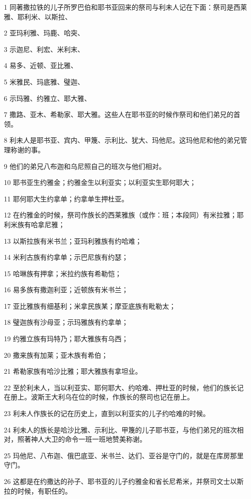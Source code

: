 \par 1 同著撒拉铁的儿子所罗巴伯和耶书亚回来的祭司与利未人记在下面：祭司是西莱雅、耶利米、以斯拉、
\par 2 亚玛利雅、玛鹿、哈突、
\par 3 示迦尼、利宏、米利末、
\par 4 易多、近顿、亚比雅、
\par 5 米雅民、玛底雅、璧迦、
\par 6 示玛雅、约雅立、耶大雅、
\par 7 撒路、亚木、希勒家、耶大雅。这些人在耶书亚的时候作祭司和他们弟兄的首领。
\par 8 利未人是耶书亚、宾内、甲篾、示利比、犹大、玛他尼。这玛他尼和他的弟兄管理称谢的事。
\par 9 他们的弟兄八布迦和乌尼照自己的班次与他们相对。
\par 10 耶书亚生约雅金；约雅金生以利亚实；以利亚实生耶何耶大；
\par 11 耶何耶大生约拿单；约拿单生押杜亚。
\par 12 在约雅金的时候，祭司作族长的西莱雅族（或作：班；本段同）有米拉雅；耶利米族有哈拿尼雅；
\par 13 以斯拉族有米书兰；亚玛利雅族有约哈难；
\par 14 米利古族有约拿单；示巴尼族有约瑟；
\par 15 哈琳族有押拿；米拉约族有希勒恺；
\par 16 易多族有撒迦利亚；近顿族有米书兰；
\par 17 亚比雅族有细基利；米拿民族某；摩亚底族有毗勒太；
\par 18 璧迦族有沙母亚；示玛雅族有约拿单；
\par 19 约雅立族有玛特乃；耶大雅族有乌西；
\par 20 撒来族有加莱；亚木族有希伯；
\par 21 希勒家族有哈沙比雅；耶大雅族有拿坦业。
\par 22 至於利未人，当以利亚实、耶何耶大、约哈难、押杜亚的时候，他们的族长记在册上。波斯王大利乌在位的时候，作族长的祭司也记在册上。
\par 23 利未人作族长的记在历史上，直到以利亚实的儿子约哈难的时候。
\par 24 利未人的族长是哈沙比雅、示利比、甲篾的儿子耶书亚，与他们弟兄的班次相对，照著神人大卫的命令一班一班地赞美称谢。
\par 25 玛他尼、八布迦、俄巴底亚、米书兰、达们、亚谷是守门的，就是在库房那里守门。
\par 26 这都是在约撒达的孙子、耶书亚的儿子约雅金和省长尼希米，并祭司文士以斯拉的时候，有职任的。

